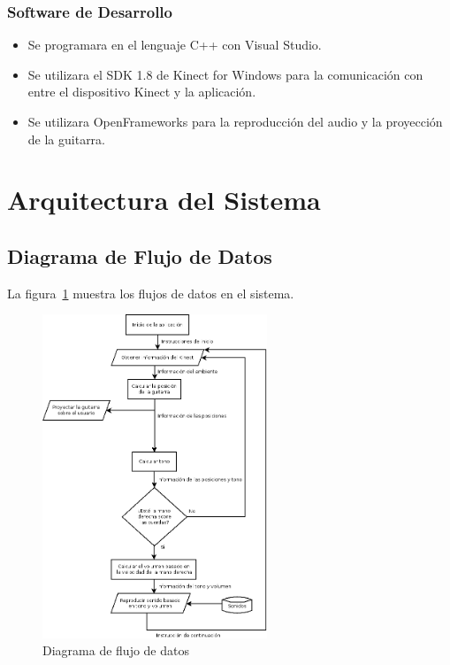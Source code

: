 \documentclass[a4paper,12pt]{article}
\begin{document}
\subsubsection{Software de Desarrollo}
\label{subsubsec:software}

\begin{itemize}
	\item Se programara en el lenguaje C++ con Visual Studio.
	\item Se utilizara el SDK 1.8 de Kinect for Windows para la comunicación con entre el dispositivo Kinect y la aplicación. 
	\item Se utilizara OpenFrameworks para la reproducción del audio y la proyección de la guitarra.
\end{itemize}

\section{Arquitectura del Sistema}

\subsection{Diagrama de Flujo de Datos}

La figura~\ref{fig:flujo} muestra los flujos de datos en el sistema.

\begin{figure}[h!]
        \centering
        \includegraphics[width=0.6\textwidth]{../imagenes/diagrama_de_flujo.png}
        \caption{Diagrama de flujo de datos}
        \label{fig:flujo}
\end{figure}
\newpage
\end{document}
